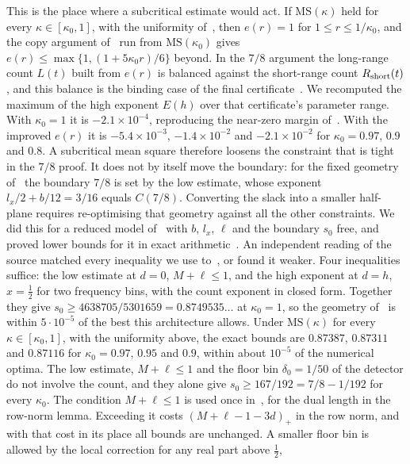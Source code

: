 \documentclass[11pt]{article}
\theoremstyle{remark}
\begin{document}
This is the place where a subcritical estimate would act. If $\mathrm{MS}(\kappa)$ held for every
$\kappa\in[\kappa_0,1]$, with the uniformity of~\cite[(17.87)]{OAI78}, then $e(r)=1$ for
$1\le r\le1/\kappa_0$, and the copy argument of~\cite[Lemma~17.6]{OAI78} run from $\mathrm{MS}(\kappa_0)$
gives $e(r)\le\max\{1,(1+5\kappa_0r)/6\}$ beyond. In the $7/8$ argument the long-range count
$L(t)$ built from $e(r)$ is balanced against the short-range count $R_{\rm short}(t)$, and this
balance is the binding case of the final certificate~\cite[Lemma~20.2]{OAI78}. We recomputed
the maximum of the high exponent $E(h)$ over that certificate's parameter range. With
$\kappa_0=1$ it is $-2.1\times10^{-4}$, reproducing the near-zero margin of~\cite{OAI78}. With
the improved $e(r)$ it is $-5.4\times10^{-3}$, $-1.4\times10^{-2}$ and $-2.1\times10^{-2}$ for
$\kappa_0=0.97$, $0.9$ and $0.8$. A subcritical mean square therefore loosens the constraint that
is tight in the $7/8$ proof. It does not by itself move the boundary: for the fixed geometry
of~\cite{OAI78} the boundary $7/8$ is set by the low estimate, whose exponent $l_x/2+b/12=3/16$
equals $C(7/8)$. Converting the slack into a smaller half-plane requires re-optimising that
geometry against all the other constraints. We did this for a reduced model of~\cite[Part~II]{OAI78}
with $b$, $l_x$, $\ell$ and the boundary $s_0$ free, and proved lower bounds for it in exact
arithmetic~\cite{N78}. An independent reading of the source matched every inequality we use
to~\cite{OAI78}, or found it weaker. Four inequalities suffice: the low estimate at $d=0$,
$M+\ell\le1$, and the high exponent at $d=h$, $x=\frac12$ for two frequency bins, with the
count exponent in closed form. Together they give $s_0\ge4638705/5301659=0.8749535\ldots$ at
$\kappa_0=1$, so the geometry of~\cite{OAI78} is within $5\cdot10^{-5}$ of the best this
architecture allows. Under $\mathrm{MS}(\kappa)$ for every $\kappa\in[\kappa_0,1]$, with the
uniformity above, the exact bounds are $0.87387$, $0.87311$ and
$0.87116$ for $\kappa_0=0.97$, $0.95$ and $0.9$, within about $10^{-5}$ of the numerical optima.
The low estimate, $M+\ell\le1$ and the floor bin $\delta_0=1/50$ of the detector do not involve the
count, and they alone give $s_0\ge167/192=7/8-1/192$ for every $\kappa_0$. The condition
$M+\ell\le1$ is used once in~\cite{OAI78}, for the dual length in the row-norm lemma. Exceeding
it costs $(M+\ell-1-3d)_+$ in the row norm, and with that cost in its place all bounds are
unchanged. A smaller floor bin is allowed by the local correction for any real part above $\frac12$,
\end{document}
